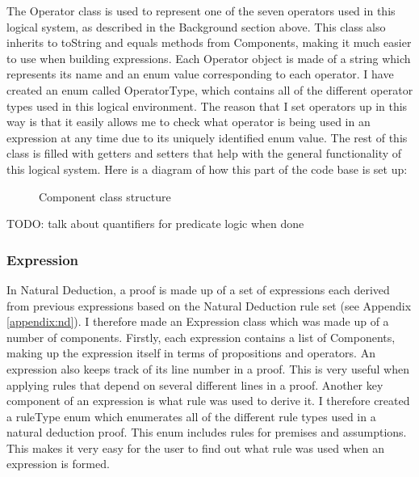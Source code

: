 The Operator class is used to represent one of the seven operators used in this logical system, as described in the Background section above. This class also inherits to toString and equals methods from Components, making it much easier to use when building expressions. Each Operator object is made of a string which represents its name and an enum value corresponding to each operator. I have created an enum called OperatorType, which contains all of the different operator types used in this logical environment. The reason that I set operators up in this way is that it easily allows me to check what operator is being used in an expression at any time due to its uniquely identified enum value. The rest of this class is filled with getters and setters that help with the general functionality of this logical system. Here is a diagram of how this part of the code base is set up:

\begin{figure}[!ht]
	\centering
	\caption{Component class structure}
\end{figure}

TODO: talk about quantifiers for predicate logic when done

\subsubsection{Expression}

In Natural Deduction, a proof is made up of a set of expressions each derived from previous expressions based on the Natural Deduction rule set (see Appendix \ref{appendix:nd}). I therefore made an Expression class which was made up of a number of components. Firstly, each expression contains a list of Components, making up the expression itself in terms of propositions and operators. An expression also keeps track of its line number in a proof. This is very useful when applying rules that depend on several different lines in a proof. Another key component of an expression is what rule was used to derive it. I therefore created a ruleType enum which enumerates all of the different rule types used in a natural deduction proof. This enum includes rules for premises and assumptions. This makes it very easy for the user to find out what rule was used when an expression is formed.

